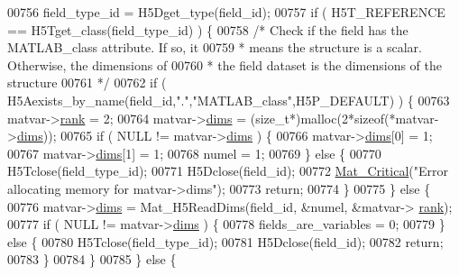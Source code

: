 \begin{DoxyCode}
00756         field\_type\_id = H5Dget\_type(field\_id);
00757         \textcolor{keywordflow}{if} ( H5T\_REFERENCE == H5Tget\_class(field\_type\_id) ) \{
00758             \textcolor{comment}{/* Check if the field has the MATLAB\_class attribute. If so, it}
00759 \textcolor{comment}{             * means the structure is a scalar. Otherwise, the dimensions of}
00760 \textcolor{comment}{             * the field dataset is the dimensions of the structure}
00761 \textcolor{comment}{             */}
00762             \textcolor{keywordflow}{if} ( H5Aexists\_by\_name(field\_id,\textcolor{stringliteral}{"."},\textcolor{stringliteral}{"MATLAB\_class"},H5P\_DEFAULT) ) \{
00763                 matvar->\hyperlink{group___m_a_t_a84ba70c96ded13cc555fa75b768d9921}{rank} = 2;
00764                 matvar->\hyperlink{group___m_a_t_a8e01234e1c862ce3472bb37f5a09b92c}{dims} = (\textcolor{keywordtype}{size\_t}*)malloc(2*\textcolor{keyword}{sizeof}(*matvar->\hyperlink{group___m_a_t_a8e01234e1c862ce3472bb37f5a09b92c}{dims}));
00765                 \textcolor{keywordflow}{if} ( NULL != matvar->\hyperlink{group___m_a_t_a8e01234e1c862ce3472bb37f5a09b92c}{dims} ) \{
00766                     matvar->\hyperlink{group___m_a_t_a8e01234e1c862ce3472bb37f5a09b92c}{dims}[0] = 1;
00767                     matvar->\hyperlink{group___m_a_t_a8e01234e1c862ce3472bb37f5a09b92c}{dims}[1] = 1;
00768                     numel = 1;
00769                 \} \textcolor{keywordflow}{else} \{
00770                     H5Tclose(field\_type\_id);
00771                     H5Dclose(field\_id);
00772                     \hyperlink{group__mat__util_gaf51f2bfbb5580f575e4dd79757e2b80c}{Mat\_Critical}(\textcolor{stringliteral}{"Error allocating memory for matvar->dims"});
00773                     \textcolor{keywordflow}{return};
00774                 \}
00775             \} \textcolor{keywordflow}{else} \{
00776                 matvar->\hyperlink{group___m_a_t_a8e01234e1c862ce3472bb37f5a09b92c}{dims} = Mat\_H5ReadDims(field\_id, &numel, &matvar->
      \hyperlink{group___m_a_t_a84ba70c96ded13cc555fa75b768d9921}{rank});
00777                 \textcolor{keywordflow}{if} ( NULL != matvar->\hyperlink{group___m_a_t_a8e01234e1c862ce3472bb37f5a09b92c}{dims} ) \{
00778                     fields\_are\_variables = 0;
00779                 \} \textcolor{keywordflow}{else} \{
00780                     H5Tclose(field\_type\_id);
00781                     H5Dclose(field\_id);
00782                     \textcolor{keywordflow}{return};
00783                 \}
00784             \}
00785         \} \textcolor{keywordflow}{else} \{

\end{DoxyCode}

